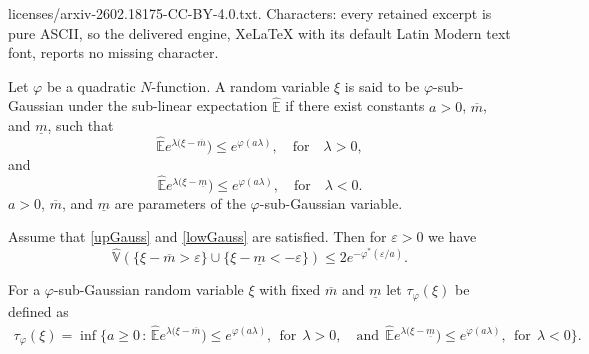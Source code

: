\documentclass[10pt,a4paper]{amsart}
\def\Eh{{\hat{\mathbb{E}}}}
\def\Vh{{\hat{\mathbb{V}}}}
\begin{document}
licenses/arxiv-2602.18175-CC-BY-4.0.txt. Characters: every retained excerpt is pure ASCII, so the delivered engine, XeLaTeX with its default Latin Modern text font, reports no missing character.
\begin{definition}
Let $\varphi$ be a quadratic $N$-function.
A random variable $\xi$ is said to be $\varphi$-sub-Gaussian under the sub-linear expectation $\Eh$ if there exist
constants  $a > 0$, $\overline{m}$, and $\underline{m}$, such that
\begin{equation}   \label{upGauss}
\Eh e^{\lambda(\xi - \overline{m}}) \le e^{\varphi(a\lambda)}, \quad {\text {for}} \quad \lambda>0,
\end{equation}
and 
\begin{equation}   \label{lowGauss}
\Eh e^{\lambda(\xi - \underline{m}}) \le e^{\varphi(a\lambda)}, \quad {\text {for}} \quad \lambda<0.
\end{equation}
$a > 0$, $\overline{m}$, and $\underline{m}$ are parameters of the $\varphi$-sub-Gaussian variable.
\end{definition}

\begin{lemma} \label{mainLemma}
Assume that \eqref{upGauss} and \eqref{lowGauss} are satisfied.
Then for $\varepsilon>0$ we have
\begin{equation}
\Vh\left( \{ \xi-\overline{m} > \varepsilon \} \cup \{ \xi-\underline{m} < -\varepsilon \} \right)  
\le 2 e^{-\varphi^*\left(\varepsilon/a\right)}.
\end{equation}

\end{lemma}

\begin{definition} \label{tau}
For a $\varphi$-sub-Gaussian random variable $\xi$ with fixed $\overline{m}$ and $\underline{m}$
 let $\tau_\varphi(\xi)$ be defined as
\begin{eqnarray*}
\tau_\varphi(\xi)
=
\inf\Big\{
a \ge 0 \, :\, 
\Eh e^{\lambda(\xi - \overline{m}}) \le e^{\varphi(a\lambda)}, \ \ {\text {for}} \ \ \lambda>0, \quad 
\text{and} \ \ \Eh e^{\lambda(\xi - \underline{m}}) \le e^{\varphi(a\lambda)}, \ \ {\text {for}} \ \ \lambda<0  
\Big\}.
\end{eqnarray*}
\end{definition}
\end{document}
